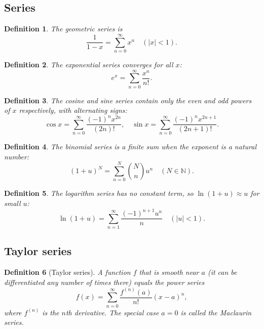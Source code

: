 \documentclass{article}
\newtheorem{definition}{Definition}
\begin{document}
\subsection{Series}
\begin{definition}
    The geometric series is
    \begin{equation}
        \frac{1}{1-x} = \sum_{n=0}^{\infty}x^n \quad (|x|<1).
    \end{equation}
\end{definition}
\begin{definition}
    The exponential series converges for all $x$:
    \begin{equation}
        e^{x} = \sum_{n=0}^{\infty}\frac{x^n}{n!}.
    \end{equation}
\end{definition}
\begin{definition}
    The cosine and sine series contain only the even and odd powers of $x$ respectively, with alternating signs:
    \begin{equation}
        \cos x = \sum_{n=0}^{\infty}\frac{(-1)^n x^{2n}}{(2n)!}, \quad \sin x = \sum_{n=0}^{\infty}\frac{(-1)^n x^{2n+1}}{(2n+1)!}.
    \end{equation}
\end{definition}
\begin{definition}
    The binomial series is a finite sum when the exponent is a natural number:
    \begin{equation}
        (1+u)^N = \sum_{n=0}^{N}\binom{N}{n}u^n \quad (N \in \mathbb{N}).
    \end{equation}
\end{definition}
\begin{definition}
    The logarithm series has no constant term, so $\ln(1+u) \approx u$ for small $u$:
    \begin{equation}
        \ln(1+u) = \sum_{n=1}^{\infty}\frac{(-1)^{n+1}u^n}{n} \quad (|u|<1).
    \end{equation}
\end{definition}

\subsection{Taylor series}
\begin{definition}[Taylor series]
    A function $f$ that is smooth near $a$ (it can be differentiated any number of times there) equals the power series
    \begin{equation}
        f(x) = \sum_{n=0}^{\infty}\frac{f^{(n)}(a)}{n!}(x-a)^n,
    \end{equation}
    where $f^{(n)}$ is the $n$th derivative. The special case $a = 0$ is called the Maclaurin series.
\end{definition}
\end{document}
